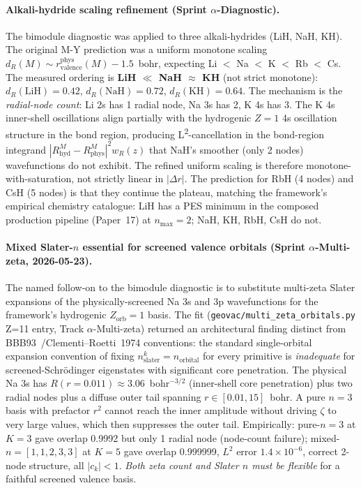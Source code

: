 \documentclass[aps,pra,twocolumn,superscriptaddress,longbibliography]{revtex4-2}
\begin{document}
\paragraph{Alkali-hydride scaling refinement (Sprint $\alpha$-Diagnostic).}
The bimodule diagnostic was applied to three alkali-hydrides
(LiH, NaH, KH).  The original M-Y prediction was a uniform monotone
scaling $d_R(M) \sim r^\text{phys}_\text{valence}(M) - 1.5$~bohr,
expecting Li $<$ Na $<$ K $<$ Rb $<$ Cs.  The measured ordering is
\textbf{LiH $\ll$ NaH $\approx$ KH} (not strict monotone):
$d_R(\text{LiH}) = 0.42$, $d_R(\text{NaH}) = 0.72$,
$d_R(\text{KH}) = 0.64$.  The mechanism is the
\emph{radial-node count}:
Li 2s has 1 radial node, Na 3s has 2, K 4s has 3.  The K 4s
inner-shell oscillations align partially with the hydrogenic
$Z=1$ 4s oscillation structure in the bond region, producing
L\textsuperscript{2}-cancellation in the bond-region integrand
$|R^M_\text{hyd} - R^M_\text{phys}|^2 w_R(z)$ that NaH's smoother
(only 2 nodes) wavefunctions do not exhibit.  The refined uniform
scaling is therefore monotone-with-saturation, not strictly linear
in $|\Delta r|$.  The prediction for RbH (4 nodes) and CsH
(5 nodes) is that they continue the plateau, matching the framework's
empirical chemistry catalogue: LiH has a PES minimum in the composed
production pipeline (Paper~17) at $n_{\max}=2$; NaH, KH, RbH, CsH do not.

\paragraph{Mixed Slater-$n$ essential for screened valence orbitals
(Sprint $\alpha$-Multi-zeta, 2026-05-23).}
The named follow-on to the bimodule diagnostic is to substitute
multi-zeta Slater expansions of the physically-screened Na 3s and 3p
wavefunctions for the framework's hydrogenic $Z_\text{orb}=1$ basis.
The fit (\texttt{geovac/multi\_zeta\_orbitals.py} Z=11 entry, Track
$\alpha$-Multi-zeta) returned an architectural finding distinct from
BBB93~\cite{bunge1993}/Clementi--Roetti~1974 conventions: the standard
single-orbital expansion convention of fixing
$n_\text{slater}^k = n_\text{orbital}$ for every primitive is
\emph{inadequate} for screened-Schr\"odinger eigenstates with
significant core penetration.  The physical Na 3s has $R(r=0.011)
\approx 3.06$~bohr$^{-3/2}$ (inner-shell core penetration) plus two
radial nodes plus a diffuse outer tail spanning $r \in [0.01, 15]$~bohr.
A pure $n=3$ basis with prefactor $r^2$ cannot reach the inner
amplitude without driving $\zeta$ to very large values, which then
suppresses the outer tail.  Empirically:
pure-$n=3$ at $K=3$ gave overlap 0.9992 but only 1 radial node
(node-count failure); mixed-$n=[1,1,2,3,3]$ at $K=5$ gave overlap
0.999999, $L^2$ error $1.4 \times 10^{-6}$, correct 2-node structure,
all $|c_k| < 1$.  \emph{Both zeta count and Slater $n$ must be flexible}
for a faithful screened valence basis.
\end{document}
